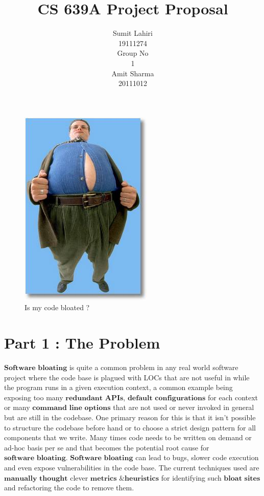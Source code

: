 \documentclass{article} %
\title{CS 639A Project Proposal}
\author{
Sumit Lahiri \\
19111274 \\
\And
Group No\\
1\\
\And
Amit Sharma \\
20111012\\
}
\begin{document}
\maketitle

\begin{figure}[htbp]
\centerline{\includegraphics[scale=0.5]{blaot.jpg}}
\caption{Is my code bloated ?}
\label{fig}
\end{figure}

\section*{Part 1 : The Problem}
$\textbf{Software bloating}$ is quite a common problem in any real world software project where the code base is plagued with LOCs that are not useful in while the program runs in a given execution context, a common example being exposing too many $\textbf{redundant APIs}$, $\textbf{default configurations}$ for each context or many $\textbf{command line options}$ that are not used or never invoked in general but are still in the codebase. One primary reason for this is that it isn't possible to structure the codebase before hand or to choose a strict design pattern for all components that we write. Many times code needs to be written on demand or ad-hoc basis per se and that becomes the potential root cause for $\textbf{software bloating}$. $\textbf{Software bloating}$ can lead to bugs, slower code execution and even expose vulnerabilities in the code base. The current techniques used are $\textbf{manually thought}$ clever $\textbf{metrics \& heuristics}$ for identifying such $\textbf{bloat sites}$ and refactoring the code to remove them. 
\end{document}
